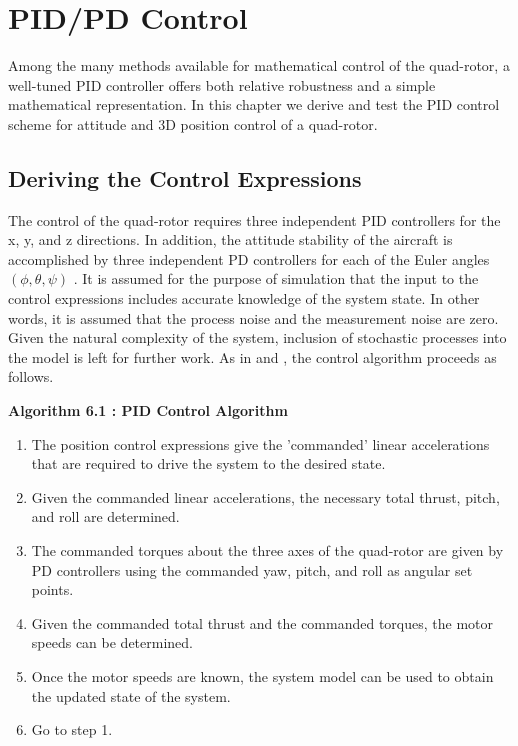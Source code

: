 
\chapter{PID/PD Control} %

\label{Chapter6} %


Among the many methods available for mathematical control of the quad-rotor, a well-tuned PID controller offers both relative robustness and a simple mathematical representation. In this chapter we derive and test the PID control scheme for attitude and 3D position control of a quad-rotor.

\section{Deriving the Control Expressions}

The control of the quad-rotor requires three independent PID controllers for the x, y, and z directions. In addition, the attitude stability of the aircraft is accomplished by three independent PD controllers for each of the Euler angles $(\phi,\theta,\psi)$ . It is assumed for the purpose of simulation that the input to the control expressions includes accurate knowledge of the system state. In other words, it is assumed that the process noise and the measurement noise are zero. Given the natural complexity of the system, inclusion of stochastic processes into the model is left for further work. As in \cite{bouabdallah2004pid} and \cite{Luukkonen}, the control algorithm proceeds as follows.

\begin{center}\textbf{Algorithm 6.1 : PID Control Algorithm}\end{center}
    \begin{enumerate}
    \item The position control expressions give the 'commanded' linear accelerations that are required to drive the system to the desired state.
    \item Given the commanded linear accelerations, the necessary total thrust, pitch, and roll are determined.
    \item The commanded torques about the three axes of the quad-rotor are given by PD controllers using the commanded yaw, pitch, and roll as angular set points.
    \item Given the commanded total thrust and the commanded torques, the motor speeds can be determined.
    \item Once the motor speeds are known, the system model can be used to obtain the updated state of the system.
    \item Go to step 1.
    \end{enumerate}

